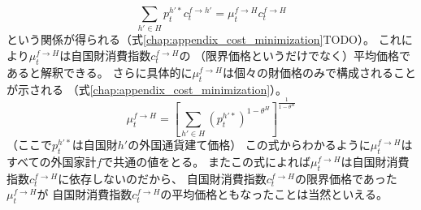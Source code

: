 \begin{equation}
\label{form:chapter3_households_stage1a_foreign_c_f_H_problem_mu_f_H_average_eq}
    \sum_{h'\in H}p_t^{h'*}c_t^{f\to h'}=\mu_t^{f\to H}c_t^{f\to H}
\end{equation}
という関係が得られる（式\eqref{chap:appendix_cost_minimization}TODO）。
これにより\(\mu_t^{f\to H}\)は自国財消費指数\(c_t^{f\to H}\)の
（限界価格というだけでなく）平均価格であると解釈できる。
さらに具体的に\(\mu_t^{f\to H}\)は個々の財価格のみで構成されることが示される
（式\eqref{chap:appendix_cost_minimization}）。
\begin{equation}
\label{form:chapter3_households_stage1a_foreign_c_f_H_problem_mu_f_H_eq}
    \mu_t^{f\to H}=\left[\sum_{h'\in H}(p_t^{h'*})^{1-\theta^H}\right]^{\frac{1}{1-\theta^H}}
\end{equation}
（ここで\(p_t^{h'*}\)は自国財\(h'\)の外国通貨建て価格）
この式からわかるように\(\mu_t^{f\to H}\)はすべての外国家計\(f\)で共通の値をとる。
またこの式によれば\(\mu_t^{f\to H}\)は自国財消費指数\(c_t^{f\to H}\)に依存しないのだから、
自国財消費指数\(c_t^{f\to H}\)の限界価格であった\(\mu_t^{f\to H}\)が
自国財消費指数\(c_t^{f\to H}\)の平均価格ともなったことは当然といえる。

